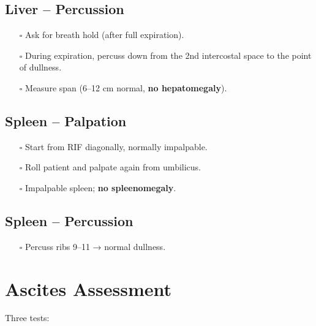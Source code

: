 \documentclass[
  13.5pt,
  a4paper,
  DIV=11,
  numbers=noendperiod]{scrreprt}
\providecommand{\tightlist}{%
  \setlength{\itemsep}{0pt}\setlength{\parskip}{0pt}}
\begin{document}
\subsection{Liver -- Percussion}\label{liver-percussion-1}

\begin{itemize}
\tightlist
\item[$\square$]
  Ask for breath hold (after full expiration).
\item[$\square$]
  During expiration, percuss down from the 2nd intercostal space to the
  point of dullness.
\item[$\square$]
  Measure span (6--12 cm normal, \textbf{no hepatomegaly}).
\end{itemize}

\subsection{Spleen -- Palpation}\label{spleen-palpation-1}

\begin{itemize}
\tightlist
\item[$\square$]
  Start from RIF diagonally, normally impalpable.
\item[$\square$]
  Roll patient and palpate again from umbilicus.
\item[$\square$]
  Impalpable spleen; \textbf{no spleenomegaly}.
\end{itemize}

\subsection{Spleen -- Percussion}\label{spleen-percussion-1}

\begin{itemize}
\tightlist
\item[$\square$]
  Percuss ribs 9--11 → normal dullness.
\end{itemize}

\section{Ascites Assessment}\label{ascites-assessment-1}

Three tests:
\end{document}
